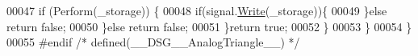 \begin{DoxyCode}
00047                 \textcolor{keywordflow}{if} (Perform(\_storage)) \{
00048                     \textcolor{keywordflow}{if}(signal.\hyperlink{class_d_s_g_1_1_ring_buffer_aa5dd2caa0a270173251faee40a43d692}{Write}(\_storage))\{
00049                     \}\textcolor{keywordflow}{else} \textcolor{keywordflow}{return} \textcolor{keyword}{false};
00050                 \}\textcolor{keywordflow}{else} \textcolor{keywordflow}{return} \textcolor{keyword}{false};
00051             \}\textcolor{keywordflow}{return} \textcolor{keyword}{true};
00052         \}
00053     \}
00054 \} 
00055 \textcolor{preprocessor}{#endif }\textcolor{comment}{/* defined(\_\_DSG\_\_AnalogTriangle\_\_) */}\textcolor{preprocessor}{}
\end{DoxyCode}
